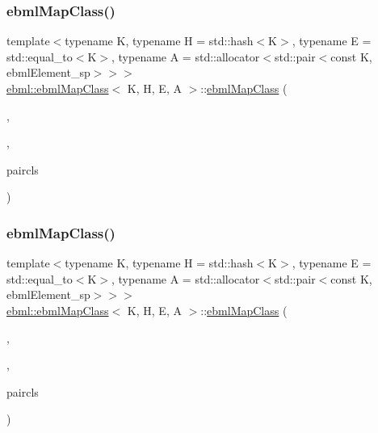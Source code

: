 \mbox{\label{classebml_1_1ebmlMapClass_a27b494be5247aa4152bf994906ec117b}} 
\subsubsection{\texorpdfstring{ebml\+Map\+Class()}{ebmlMapClass()}\hspace{0.1cm}{\footnotesize\ttfamily [3/4]}}
{\footnotesize\ttfamily template$<$typename K, typename H = std\+::hash$<$\+K$>$, typename E = std\+::equal\+\_\+to$<$\+K$>$, typename A = std\+::allocator$<$std\+::pair$<$const K, ebml\+Element\+\_\+sp$>$$>$$>$ \\
\mbox{\hyperlink{classebml_1_1ebmlMapClass}{ebml\+::ebml\+Map\+Class}}$<$ K, H, E, A $>$\+::\mbox{\hyperlink{classebml_1_1ebmlMapClass}{ebml\+Map\+Class}} (\begin{DoxyParamCaption}\item[{\mbox{\hyperlink{namespaceebml_a86c5f604ddf12a74aa9812e997a58691}{ebml\+I\+D\+\_\+t}}}]{,  }\item[{const std\+::wstring \&}]{,  }\item[{const \mbox{\hyperlink{classebml_1_1ebmlElementClass}{ebml\+Element\+Class}} $\ast$}]{paircls }\end{DoxyParamCaption})}

\mbox{\label{classebml_1_1ebmlMapClass_a705b59b34949371aa925dc98e59213de}} 
\subsubsection{\texorpdfstring{ebml\+Map\+Class()}{ebmlMapClass()}\hspace{0.1cm}{\footnotesize\ttfamily [4/4]}}
{\footnotesize\ttfamily template$<$typename K, typename H = std\+::hash$<$\+K$>$, typename E = std\+::equal\+\_\+to$<$\+K$>$, typename A = std\+::allocator$<$std\+::pair$<$const K, ebml\+Element\+\_\+sp$>$$>$$>$ \\
\mbox{\hyperlink{classebml_1_1ebmlMapClass}{ebml\+::ebml\+Map\+Class}}$<$ K, H, E, A $>$\+::\mbox{\hyperlink{classebml_1_1ebmlMapClass}{ebml\+Map\+Class}} (\begin{DoxyParamCaption}\item[{\mbox{\hyperlink{namespaceebml_a86c5f604ddf12a74aa9812e997a58691}{ebml\+I\+D\+\_\+t}}}]{,  }\item[{const std\+::wstring \&}]{,  }\item[{const \mbox{\hyperlink{classebml_1_1ebmlPairClass}{ebml\+Pair\+Class}}$<$ const K $>$ $\ast$}]{paircls }\end{DoxyParamCaption})}



